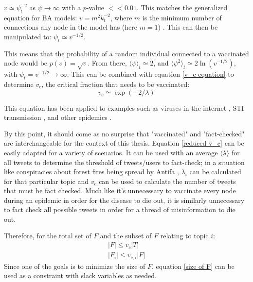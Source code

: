 \documentclass[NETN,manuscript]{stjour-new}
\begin{document}
$v \simeq \psi_t^{-2}$ as $\psi \rightarrow \infty$ with a $p$-value $<< 0.01$. This matches the generalized equation for BA models: $v = m^2k_t^{-2}$, where $m$ is the minimum number of connections any node in the model has (here $m = 1$) \citep{pastor2001epidemic}. This can then be manipulated to: $\psi_t \simeq v^{-1/2}$. 

This means that the probability of a random individual connected to a vaccinated node would be $p(v) = \sqrt{v}$. From there, $\langle \psi \rangle_t \simeq 2$, and $\langle \psi^2 \rangle_t \simeq 2 \ln(v^{-1/2})$, with $\psi_t = v^{-1/2} \rightarrow \infty$. This can be combined with equation \ref{v_c equation} to determine $v_c$, the critical fraction that needs to be vaccinated:
\begin{equation}
\label{reduced v_c} 
    v_c \simeq \exp{(-2/\lambda)}
\end{equation}

This equation has  been applied to examples such as viruses in the internet \citep{kephart1993computers}, STI transmission \citep{anderson1992infectious,lloyd2001viruses}, and other epidemics \citep{diekmann2000mathematical}. 

By this point, it should come as no surprise that "vaccinated" and "fact-checked" are interchangeable for the context of this thesis. Equation \ref{reduced v_c} can be easily adapted for a variety of scenarios. It can be used with an average $\langle \lambda \rangle$ for all tweets to determine the threshold of tweets/users to fact-check; in a situation like conspiracies about forest fires being spread by Antifa \citep{robinson2020oregon}, $\lambda_i$ can be calculated for that particular topic and $v_c$ can be used to calculate the number of tweets that must be fact checked. Much like it's unnecessary to vaccinate every node during an epidemic in order for the disease to die out, it is similarly unnecessary to fact check all possible tweets in order for a thread of misinformation to die out.

Therefore, for the total set of $F$ and the subset of $F$ relating to topic $i$: 
\begin{equation}
    \label{size of F}
    \begin{split}
    |F| \leq v_{c}|T| \\
    |F_{i}| \leq v_{c,i}|F|
    \end{split}
\end{equation}
Since one of the goals is to minimize the size of $F$, equation \ref{size of F} can be used as a constraint with slack variables as needed.
\end{document}
